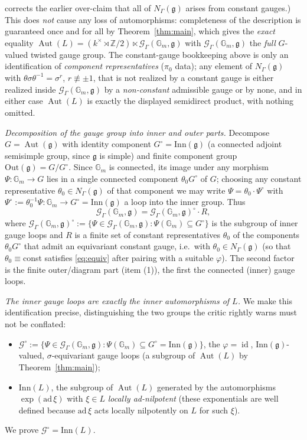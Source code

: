 \documentclass{amsart}
\theoremstyle{definition}
\DeclareMathOperator{\Aut}{Aut}
\DeclareMathOperator{\id}{id}
\newcommand{\Gm}{\mathbb{G}_m}
\newcommand{\g}{\mathfrak{g}}
\newcommand{\Z}{\mathbb{Z}}
\begin{document}
corrects the earlier over-claim that all of $N_\Gamma(\g)$ arises from
constant gauges.)  This does \emph{not} cause any loss of automorphisms:
completeness of the description is guaranteed once and for all by
Theorem~\ref{thm:main}, which gives the \emph{exact} equality
$\Aut(L)=(k^\times\rtimes\Z/2)\ltimes\mathcal G_\Gamma(\Gm,\g)$ with
$\mathcal G_\Gamma(\Gm,\g)$ the \emph{full} $G$-valued twisted gauge
group.  The constant-gauge bookkeeping above is only an identification of
\emph{component representatives} ($\pi_0$ data); any element of
$N_\Gamma(\g)$ with $\theta\sigma\theta^{-1}=\sigma^{r}$,
$r\not\equiv\pm1$, that is not realized by a constant gauge is either
realized inside $\mathcal G_\Gamma(\Gm,\g)$ by a \emph{non-constant}
admissible gauge or by none, and in either case $\Aut(L)$ is exactly the
displayed semidirect product, with nothing omitted.

\emph{Decomposition of the gauge group into inner and outer parts.}
Decompose $G=\Aut(\g)$ with identity component $G^\circ=\mathrm{Inn}(\g)$
(a connected adjoint semisimple group, since $\g$ is simple) and finite
component group $\mathrm{Out}(\g)=G/G^\circ$.  Since $\Gm$ is connected,
its image under any morphism $\Psi\colon\Gm\to G$ lies in a single
connected component $\theta_0 G^\circ$ of $G$; choosing any constant
representative $\theta_0\in N_\Gamma(\g)$ of that component we may write
$\Psi=\theta_0\cdot\Psi^\circ$ with $\Psi^\circ:=\theta_0^{-1}\Psi\colon
\Gm\to G^\circ=\mathrm{Inn}(\g)$ a loop into the inner group.  Thus
\begin{equation}\label{eq:gaugesplit}
\mathcal G_\Gamma(\Gm,\g)=
\mathcal G_\Gamma(\Gm,\g)^\circ\cdot R,
\end{equation}
where $\mathcal G_\Gamma(\Gm,\g)^\circ:=\{\Psi\in\mathcal G_\Gamma(\Gm,\g):
\Psi(\Gm)\subseteq G^\circ\}$ is the subgroup of inner gauge loops and $R$
is a finite set of constant representatives $\theta_0$ of the components
$\theta_0 G^\circ$ that admit an equivariant constant gauge, i.e.\ with
$\theta_0\in N_\Gamma(\g)$ (so that $\theta_0\equiv$const satisfies
\eqref{eq:equiv} after pairing with a suitable $\varphi$).  The second
factor is the finite outer/diagram part (item (1)), the first the
connected (inner) gauge loops.

\emph{The inner gauge loops are exactly the inner automorphisms of $L$.}
We make this identification precise, distinguishing the two groups the
critic rightly warns must not be conflated:
\begin{itemize}
\item $\mathcal G^\circ:=\{\Psi\in\mathcal G_\Gamma(\Gm,\g):
\Psi(\Gm)\subseteq G^\circ=\mathrm{Inn}(\g)\}$, the $\varphi=\id$,
$\mathrm{Inn}(\g)$-valued, $\sigma$-equivariant gauge loops (a subgroup of
$\Aut(L)$ by Theorem~\ref{thm:main});
\item $\mathrm{Inn}(L)$, the subgroup of $\Aut(L)$ generated by the
automorphisms $\exp(\mathrm{ad}\,\xi)$ with $\xi\in L$ \emph{locally
ad-nilpotent} (these exponentials are well defined because $\mathrm{ad}\,
\xi$ acts locally nilpotently on $L$ for such $\xi$).
\end{itemize}
We prove $\mathcal G^\circ=\mathrm{Inn}(L)$.
\end{document}
